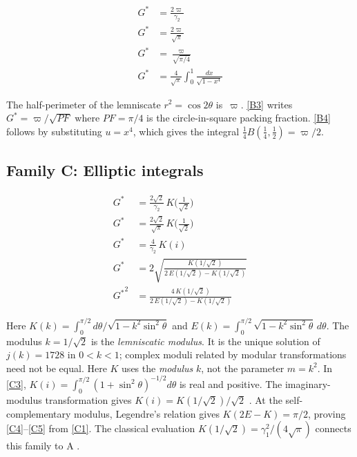\documentclass[12pt,reqno]{amsart}
\theoremstyle{definition}
\theoremstyle{remark}
\newcommand{\Gstar}{G^{\!*}}
\newcommand{\varpiup}{\varpi}
\begin{document}
\begin{align}
  {\Gstar} &= \frac{2\varpiup}{\gamma_{2}}
    \tag{B1}\label{B1}\\[5pt]
  {\Gstar} &= \frac{2\varpiup}{\sqrt{\pi}}
    \tag{B2}\label{B2}\\[5pt]
  {\Gstar} &= \frac{\varpiup}{\sqrt{\pi/4}}
    \tag{B3}\label{B3}\\[5pt]
  {\Gstar} &= \frac{4}{\sqrt{\pi}}
    \int_{0}^{1}\frac{dx}{\sqrt{1-x^{4}}}
    \tag{B4}\label{B4}
\end{align}

\noindent
The half-perimeter of the lemniscate $r^{2}=\cos 2\theta$ is~$\varpiup$.
\eqref{B3} writes $\Gstar = \varpiup/\!\sqrt{PF}$ where
$PF = \pi/4$ is the circle-in-square packing fraction.
\eqref{B4} follows by substituting $u=x^4$, which gives the integral
$\tfrac14 B(\tfrac14,\tfrac12)=\varpiup/2$.

\subsection{Family C: Elliptic integrals}\label{sec:C}

\begin{align}
  {\Gstar} &= \frac{2\sqrt{2}}{\gamma_{2}}\,
    K\!\bigl(\tfrac{1}{\sqrt{2}}\bigr)
    \tag{C1}\label{C1}\\[5pt]
  {\Gstar} &= \frac{2\sqrt{2}}{\sqrt{\pi}}\,
    K\!\bigl(\tfrac{1}{\sqrt{2}}\bigr)
    \tag{C2}\label{C2}\\[5pt]
  {\Gstar} &= \frac{4}{\gamma_{2}}\,K(i)
    \tag{C3}\label{C3}\\[5pt]
  {\Gstar} &= 2\sqrt{\frac{K(1/\!\sqrt{2})}{2\,E(1/\!\sqrt{2})-K(1/\!\sqrt{2})}}
    \tag{C4}\label{C4}\\[5pt]
  {\Gstar}^{2} &= \frac{4\,K(1/\!\sqrt{2})}{2\,E(1/\!\sqrt{2})-K(1/\!\sqrt{2})}
    \tag{C5}\label{C5}
\end{align}

\noindent
Here $K(k)=\int_{0}^{\pi/2}d\theta/\sqrt{1-k^{2}\sin^{2}\theta}$ and
$E(k)=\int_{0}^{\pi/2}\sqrt{1-k^{2}\sin^{2}\theta}\,d\theta$.
The modulus $k=1/\!\sqrt{2}$ is the \emph{lemniscatic modulus}.
It is the unique solution of $j(k)=1728$ in $0<k<1$; complex moduli
related by modular transformations need not be equal.
Here $K$ uses the \emph{modulus} $k$, not the parameter $m=k^2$.
In \eqref{C3}, $K(i)=\int_0^{\pi/2}(1+\sin^2\theta)^{-1/2}d\theta$
is real and positive. The imaginary-modulus transformation gives
$K(i)=K(1/\sqrt2)/\sqrt2$ \cite[19.7.2]{DLMF}.
At the self-complementary modulus, Legendre's relation gives
$K(2E-K)=\pi/2$, proving \eqref{C4}--\eqref{C5} from \eqref{C1}.
The classical evaluation $K(1/\sqrt2)=\gamma_1^2/(4\sqrt\pi)$
connects this family to A \cite[23.5.5]{DLMF}.
\end{document}
